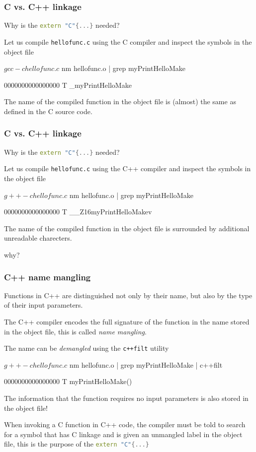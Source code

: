 \documentclass[smaller,a4paper]{beamer}
\begin{document}
\begin{frame}[fragile]\frametitle{C vs. C++ linkage}

Why is the \lstinline[language=C++]|extern "C"{...}| needed?

\null

Let us compile \lstinline{hellofunc.c} using the C compiler
and inspect the symbols in the object file
\begin{bashcommand}
$ gcc -c hellofunc.c
$ nm hellofunc.o | grep myPrintHelloMake
\end{bashcommand}
\begin{bashoutput}
0000000000000000 T _myPrintHelloMake
\end{bashoutput}
The name of the compiled function in the object file is (almost) the same
as defined in the C source code.
\end{frame}

\begin{frame}[fragile]\frametitle{C vs. C++ linkage}

Why is the \lstinline[language=C++]|extern "C"{...}| needed?

\null

Let us compile \lstinline{hellofunc.c} using the C++ compiler
and inspect the symbols in the object file
\begin{bashcommand}
$ g++ -c hellofunc.c
$ nm hellofunc.o | grep myPrintHelloMake
\end{bashcommand}
\begin{bashoutput}
0000000000000000 T __Z16myPrintHelloMakev
\end{bashoutput}
The name of the compiled function in the object file is surrounded
by additional unreadable charecters. 

\null 

why?
\end{frame}


\begin{frame}[fragile]\frametitle{C++ name mangling}
Functions in C++ are distinguished not only by their name, 
but also by the type of their input parameters.

\null

The C++ compiler encodes the full signature of the function in the
name stored in the object file, this is called \emph{name mangling}.

\null

The name can be \emph{demangled} using the \lstinline[language=bash]|c++filt| utility
\begin{bashcommand}
$ g++ -c hellofunc.c
$ nm hellofunc.o | grep myPrintHelloMake | c++filt
\end{bashcommand}
\begin{bashoutput}
0000000000000000 T myPrintHelloMake()
\end{bashoutput}
The information that the function requires no input parameters is also stored in the object file!

\null

When invoking a C function in C++ code, the compiler must be told to search for a symbol that has
C linkage and is given an unmangled label in the object file, this is the purpose of the \lstinline[language=C++]|extern "C"{...}|
\end{frame}
\end{document}
